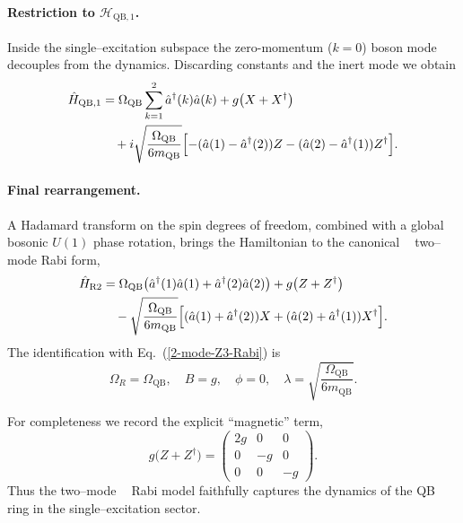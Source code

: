 \documentclass[reprint, aps, prx, amsmath, amssymb, longbibliography, superscriptaddress]{revtex4-2}
\DeclareMathOperator{\Zthree}{\mathbb{Z}_3}
\begin{document}
\paragraph{Restriction to $\mathcal H_{\text{QB},1}$.}
Inside the single--excitation subspace the zero-momentum ($k=0$) boson mode
decouples from the dynamics.  Discarding constants and the inert mode we obtain
\begin{equation}
  \begin{aligned}
    \hat H_{\text{QB},1} &= \Omega_{\text{QB}} \sum_{k=1}^{2} \hat a^{\dagger}(k)
      \hat a(k) + g \bigl( X + X^{\dagger} \bigr)
      \\
      &\quad + i \sqrt{ \frac{\Omega_{\text{QB}}}{6 m_{\text{QB}}} }
        \Bigl[ -( \hat a(1) - \hat a^{\dagger}(2) ) Z
        - ( \hat a(2) - \hat a^{\dagger}(1) ) Z^{\dagger} \Bigr].
  \end{aligned}
\end{equation}

\paragraph{Final rearrangement.}
A Hadamard transform on the spin degrees of freedom, combined with a global
bosonic $U(1)$ phase rotation, brings the Hamiltonian to the canonical
$\Zthree$ two--mode Rabi form,
\begin{equation}
\label{effective-rabi}
  \begin{aligned}
    \hat H_{\text{R}2} &= \Omega_{\text{QB}}
      \bigl( \hat a^{\dagger}(1) \hat a(1) + \hat a^{\dagger}(2) \hat a(2) \bigr)
      + g \bigl( Z + Z^{\dagger} \bigr)
      \\
      &\quad - \sqrt{ \frac{\Omega_{\text{QB}}}{6 m_{\text{QB}}} }
      \Bigl[ ( \hat a(1) + \hat a^{\dagger}(2) ) X
        + ( \hat a(2) + \hat a^{\dagger}(1) ) X^{\dagger} \Bigr].
  \end{aligned}
\end{equation}
The identification with Eq.~(\ref{2-mode-Z3-Rabi}) is
\begin{equation}
\label{QB-RM-parameter-mapping}
  \Omega_R = \Omega_{\text{QB}},
  \quad B = g,
  \quad \phi = 0,
  \quad \lambda = \sqrt{ \frac{\Omega_{\text{QB}}}{6 m_{\text{QB}}} }.
\end{equation}

For completeness we record the explicit ``magnetic'' term,
\begin{equation}
\label{superconducting-magnetic-term}
  g \bigl( Z + Z^{\dagger} \bigr) =
  \begin{pmatrix}
    2 g & 0 & 0 \\
    0 & -g & 0 \\
    0 & 0 & -g
  \end{pmatrix}.
\end{equation}
Thus the two--mode $\Zthree$ Rabi model faithfully captures the dynamics of
the QB ring in the single--excitation sector.
\end{document}
